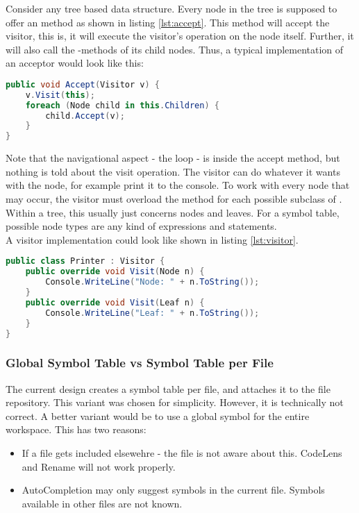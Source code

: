 Consider any tree based data structure.
Every node in the tree is supposed to offer an  method as shown in listing \ref{lst:accept}.
This method will accept the visitor, this is, it will execute the visitor's operation on the node itself.
Further, it will also call the -methods of its child nodes.
Thus, a typical implementation of an acceptor would look like this:

\begin{lstlisting}[language=csharp, caption={Example for Accept}, captionpos=b, label={lst:accept}]
public void Accept(Visitor v) {
    v.Visit(this);
    foreach (Node child in this.Children) {
        child.Accept(v);
    }
}
\end{lstlisting}

Note that the navigational aspect - the  loop - is inside the accept method, but nothing is told about the visit operation.
The visitor can do whatever it wants with the node, for example print it to the console.
To work with every node that may occur, the visitor must overload the  method for each possible subclass of .
Within a tree, this usually just concerns nodes and leaves.
For a symbol table, possible node types are any kind of expressions and statements.\\

A visitor implementation could look like shown in listing \ref{lst:visitor}.

\begin{lstlisting}[language=csharp, caption={Example for Visitor}, captionpos=b, label={lst:visitor}]
public class Printer : Visitor {
    public override void Visit(Node n) {
        Console.WriteLine("Node: " + n.ToString());
    }
    public override void Visit(Leaf n) {
        Console.WriteLine("Leaf: " + n.ToString());
    }
}
\end{lstlisting}

\subsubsection{Global Symbol Table vs Symbol Table per File}
\label{section:globalSymbolTable}
The current design creates a symbol table per file, and attaches it to the file repository.
This variant was chosen for simplicity.
However, it is technically not correct.
A better variant would be to use a global symbol for the entire workspace.
This has two reasons:
\begin{itemize}
    \item If a file gets included elsewehre - the file is not aware about this. CodeLens and Rename will not work properly.
    \item AutoCompletion may only suggest symbols in the current file. Symbols available in other files are not known.
\end{itemize}

